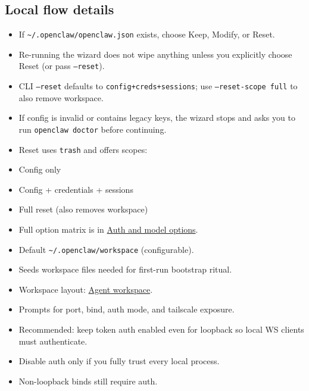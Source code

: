 \subsection{Local flow details}


\begin{itemize}
  \item If \texttt{\textasciitilde{}/.openclaw/openclaw.json} exists, choose Keep, Modify, or Reset.
  \item Re-running the wizard does not wipe anything unless you explicitly choose Reset (or pass \texttt{--reset}).
  \item CLI \texttt{--reset} defaults to \texttt{config+creds+sessions}; use \texttt{--reset-scope full} to also remove workspace.
  \item If config is invalid or contains legacy keys, the wizard stops and asks you to run \texttt{openclaw doctor} before continuing.
  \item Reset uses \texttt{trash} and offers scopes:
  \item Config only
  \item Config + credentials + sessions
  \item Full reset (also removes workspace)
\end{itemize}

\begin{itemize}
  \item Full option matrix is in \href{\#auth-and-model-options}{Auth and model options}.
\end{itemize}

\begin{itemize}
  \item Default \texttt{\textasciitilde{}/.openclaw/workspace} (configurable).
  \item Seeds workspace files needed for first-run bootstrap ritual.
  \item Workspace layout: \href{/concepts/agent-workspace}{Agent workspace}.
\end{itemize}

\begin{itemize}
  \item Prompts for port, bind, auth mode, and tailscale exposure.
  \item Recommended: keep token auth enabled even for loopback so local WS clients must authenticate.
  \item Disable auth only if you fully trust every local process.
  \item Non-loopback binds still require auth.
\end{itemize}

